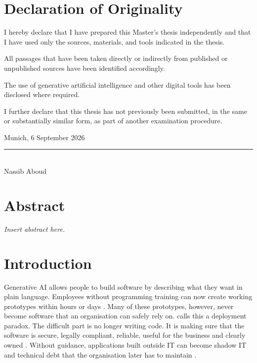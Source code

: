 \documentclass[10pt,a4paper]{article}
\begin{document}
\newpage

\section*{Declaration of Originality}

I hereby declare that I have prepared this Master's thesis independently
and that I have used only the sources, materials, and tools indicated
in the thesis.

All passages that have been taken directly or indirectly from published
or unpublished sources have been identified accordingly.

The use of generative artificial intelligence and other digital tools
has been disclosed where required.

I further declare that this thesis has not previously been submitted,
in the same or substantially similar form, as part of another examination
procedure.

\vspace{2cm}

Munich, 6 September 2026

\vspace{1.5cm}

\rule{7cm}{0.4pt}\\
Nassib Aboud


\newpage

\section*{Abstract}

\textit{Insert abstract here.}


\newpage

\tableofcontents


\newpage


\section{Introduction}
\label{sec:introduction}
 
Generative AI allows people to build software by describing what they
want in plain language. Employees without programming training can now
create working prototypes within hours or days \parencite{kobiella2026}.
Many of these prototypes, however, never become software that an
organisation can safely rely on. \textcite{maes2026} calls this a
deployment paradox. The difficult part is no longer writing code. It is
making sure that the software is secure, legally compliant, reliable,
useful for the business and clearly owned \parencite{farrag2026,kobiella2026}.
Without guidance, applications built outside IT can become shadow IT
and technical debt that the organisation later has to maintain
\parencite{viljoen2024}.
 
\end{document}
